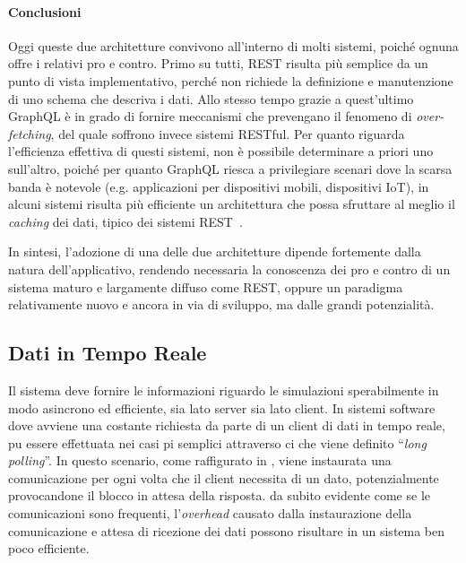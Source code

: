 \paragraph{Conclusioni}\label{par:rest-vs-gql}
Oggi queste due architetture convivono all'interno di molti sistemi, poiché ognuna offre i relativi pro e contro. Primo su tutti, \ac{REST} risulta più semplice
da un punto di vista implementativo, perché non richiede la definizione e manutenzione di uno schema che descriva i dati. Allo stesso tempo grazie a
quest'ultimo GraphQL è in grado di fornire meccanismi che prevengano il fenomeno di \textit{over-fetching}, del quale soffrono invece sistemi RESTful.
Per quanto riguarda l'efficienza effettiva di questi sistemi, non è possibile determinare a priori uno sull'altro, poiché per quanto GraphQL riesca
a privilegiare scenari dove la scarsa banda è notevole (e.g. applicazioni per dispositivi mobili, dispositivi IoT), in alcuni sistemi risulta
più efficiente un architettura che possa sfruttare al meglio il \textit{caching} dei dati, tipico dei sistemi \ac{REST}~\cite{gql_vs_rest}.

In sintesi, l'adozione di una delle due architetture dipende fortemente dalla natura dell'applicativo, rendendo necessaria la conoscenza
dei pro e contro di un sistema maturo e largamente diffuso come REST, oppure un paradigma relativamente nuovo e ancora in via di sviluppo,
ma dalle grandi potenzialità.

\subsection{Dati in Tempo Reale}\label{ssec:real-time}
Il sistema deve fornire le informazioni riguardo le simulazioni sperabilmente in modo asincrono ed efficiente, sia lato server sia lato client.
In sistemi software dove avviene una costante richiesta da parte di un client di dati in tempo reale, pu essere effettuata nei casi pi semplici
attraverso ci che viene definito ``\textit{long polling}''. In questo scenario, come raffigurato in , viene instaurata
una comunicazione per ogni volta che il client necessita di un dato, potenzialmente provocandone il blocco in attesa della risposta.  da subito
evidente come se le comunicazioni sono frequenti, l'\textit{overhead} causato dalla instaurazione della comunicazione e attesa di ricezione dei dati
possono risultare in un sistema ben poco efficiente.


